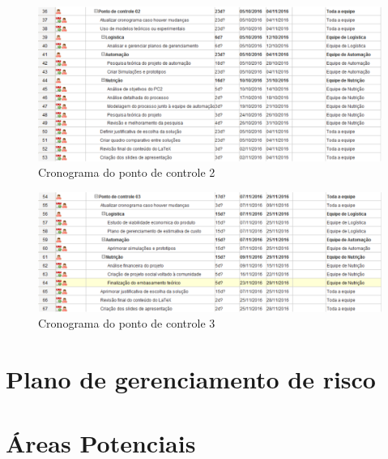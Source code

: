 \begin{anexosenv}
  \begin{figure}[!htb]
    \centering
    \includegraphics[width=15cm, keepaspectratio=true]{figuras/tempo/cronograma2.eps}
    \caption{Cronograma do ponto de controle 2}
  \end{figure}

  \begin{figure}[!htb]
    \centering
    \includegraphics[width=15cm, keepaspectratio=true]{figuras/tempo/cronograma3.eps}
    \caption{Cronograma do ponto de controle 3}
  \end{figure}


\chapter{Plano de gerenciamento de risco}

  \label{risco}

  

\chapter{Áreas Potenciais}


\end{anexosenv}
